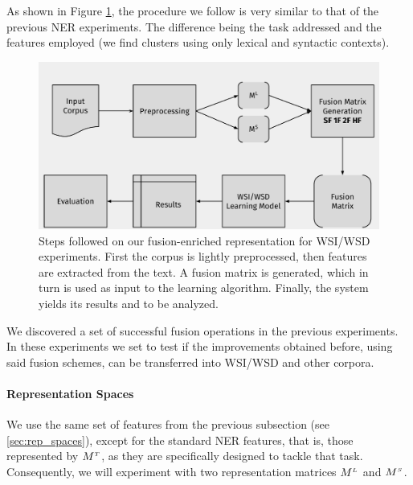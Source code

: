 As shown in Figure \ref{fig:diagmetodoWSD}, the procedure we follow is very similar to that of the previous NER experiments. The difference being the task addressed and the features employed (we find clusters using only lexical and syntactic contexts).
\begin{figure}[t]
\centering
\includegraphics[width=0.85\linewidth]{images/Chapitre4/diag_metodoWSD.pdf}
\caption{Steps followed on our fusion-enriched representation for WSI/WSD experiments. First the corpus is lightly preprocessed, then features are extracted from the text. A fusion matrix is generated, which in turn is used as input to the learning algorithm. Finally, the system yields its results and to be analyzed.}
\label{fig:diagmetodoWSD}
\end{figure}



We discovered a set of successful fusion operations in the previous experiments. In these experiments we set to test if the improvements obtained before, using said fusion schemes, can be transferred into WSI/WSD and other corpora. 

\paragraph{Representation Spaces}
We use the same set of features from the previous subsection (see \ref{sec:rep_spaces}), except for the standard NER features, that is, those represented by $M^{\scriptscriptstyle T}$, as they are specifically designed to tackle that task. Consequently, we will experiment with two representation matrices $M^{\scriptscriptstyle L}$ and $M^{\scriptscriptstyle S}$.

